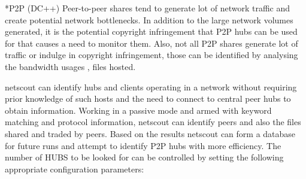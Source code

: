 \documentclass[twocolumn]{article}
\makeatletter
\def\section{\@startsection {section}{1}{\z@}{1.0ex plus 1ex minus .2ex}{.2ex plus .2ex}{\large\bf}}
\makeatother
\begin{document}

\section*{P2P (DC++)}
Peer-to-peer shares\cite{dcpp} tend to generate lot of network traffic and create potential 
network bottlenecks. In addition to the large network volumes generated, it is the potential copyright infringement 
that P2P hubs can be used for that causes a need to monitor them. Also, not all P2P shares generate lot of
traffic or indulge in copyright infringement, those can be identified by analysing the bandwidth usages
, files hosted.  

netscout can identify hubs and clients operating in  a network without requiring prior knowledge of
such hosts and the need to connect to central peer hubs to obtain information. Working in a passive mode
and armed with keyword matching and protocol information, netscout can identify peers and also the files
shared and traded by peers. Based on the results netscout can form a database for future runs and attempt
to identify P2P hubs with more efficiency.  
The number of HUBS to be looked for can be controlled by setting the following appropriate configuration parameters:
\end{document}
